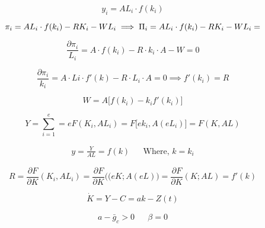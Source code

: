 \begin{equation*}
   y_i = AL_i \cdot f(k_i)
\end{equation*}

\begin{equation*}
    \pi_i = AL_i \cdot f(k_i) - RK_i - WL_i \\
    \implies \Pi_i = AL_i \cdot f(k_i) - RK_i - WL_i = 
\end{equation*}

\begin{equation*}
    \frac{\partial \pi_i}{L_i} = A \cdot f(k_i) - R \cdot k_i \cdot A - W = 0
\end{equation*}

\begin{equation*}
    \frac{\partial \pi_i}{k_i} = A \cdot Li \cdot f'(k) -  R \cdot L_i \cdot A = 0 \implies f'(k_i) = R 
\end{equation*}

\begin{equation*}
    W=A \bigg[ f(k_{i})-k_{i}f'(k_{i}) \bigg]
\end{equation*}

\begin{equation*}
    Y=\sum_{i=1}^{e}=eF(K_{i},AL_{i})=F\bigg[ ek_{i}, A(eL_{i})\bigg]=F(K,AL)
\end{equation*}

\begin{equation*}
\begin{aligned}
    y=\frac{Y}{AL}=f(k) && \text{Where, }  k=k_{i}
\end{aligned}
\end{equation*}

\begin{equation*}
    R=\frac{\partial F}{\partial K}(K_{i},AL_{i})=\frac{\partial F}{\partial K}\bigg( (eK;A(eL)\bigg)=\frac{\partial F}{\partial K}(K;AL)=f'(k)
\end{equation*}



\begin{equation}
    \dot { K } = Y - C = a k - Z ( t )
\end{equation}

\begin{align}
   a - \bar{g}_c > 0
&&
\beta = 0 
\end{align}




